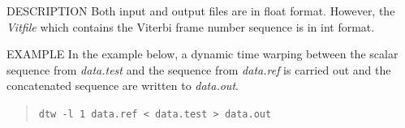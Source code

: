 \begin{qsection}{DESCRIPTION}
 Both input and output files are in float format. However,
 the {\em Vitfile} which contains the Viterbi frame number
 sequence is in int format.
\end{qsection}
\begin{options}
\end{options}

\begin{qsection}{EXAMPLE}
 In the example below, a dynamic time warping between the scalar
 sequence from {\em data.test} and
 the sequence from {\em data.ref} is carried out and
 the concatenated sequence are written to {\em data.out}.
\begin{quote}
 \verb!dtw -l 1 data.ref < data.test > data.out!
\end{quote}
\end{qsection}

